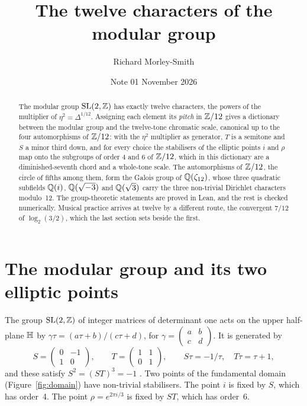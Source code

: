 \documentclass[11pt]{article}
\title{The twelve characters of the modular group}
\author{Richard Morley-Smith}
\date{Note 01 \quad November 2026}
\begin{document}
\maketitle

\begin{abstract}
\noindent
The modular group $\mathrm{SL}(2,\mathbb{Z})$ has exactly twelve characters, the powers of the multiplier of $\eta^2 = \Delta^{1/12}$.
Assigning each element its \emph{pitch} in $\mathbb{Z}/12$ gives a dictionary between the modular group and the twelve-tone chromatic scale, canonical up to the four automorphisms of $\mathbb{Z}/12$: with the $\eta^2$ multiplier as generator, $T$ is a semitone and $S$ a minor third down, and for every choice the stabilisers of the elliptic points $i$ and $\rho$ map onto the subgroups of order 4 and 6 of $\mathbb{Z}/12$, which in this dictionary are a diminished-seventh chord and a whole-tone scale.
The automorphisms of $\mathbb{Z}/12$, the circle of fifths among them, form the Galois group of $\mathbb{Q}(\zeta_{12})$, whose three quadratic subfields $\mathbb{Q}(i)$, $\mathbb{Q}(\sqrt{-3})$ and $\mathbb{Q}(\sqrt3)$ carry the three non-trivial Dirichlet characters modulo~12.
The group-theoretic statements are proved in Lean, and the rest is checked numerically.
Musical practice arrives at twelve by a different route, the convergent $7/12$ of $\log_2(3/2)$, which the last section sets beside the first.
\end{abstract}

\section{The modular group and its two elliptic points}

The group $\mathrm{SL}(2,\mathbb{Z})$ of integer matrices of determinant one acts on the upper half-plane $\mathbb{H}$ by
$\gamma\tau = (a\tau+b)/(c\tau+d)$, for $\gamma = \left(\begin{smallmatrix} a&b\\ c&d\end{smallmatrix}\right)$.
It is generated by
\[
  S = \begin{pmatrix} 0&-1\\ 1&0 \end{pmatrix},\qquad T = \begin{pmatrix} 1&1\\ 0&1 \end{pmatrix},
  \qquad S\tau = -1/\tau,\quad T\tau = \tau+1,
\]
and these satisfy $S^2 = (ST)^3 = -1$ \cite{Serre}.
Two points of the fundamental domain (Figure~\ref{fig:domain}) have non-trivial stabilisers.
The point $i$ is fixed by $S$, which has order~4.
The point $\rho = e^{2\pi i/3}$ is fixed by $ST$, which has order~6.
\end{document}

